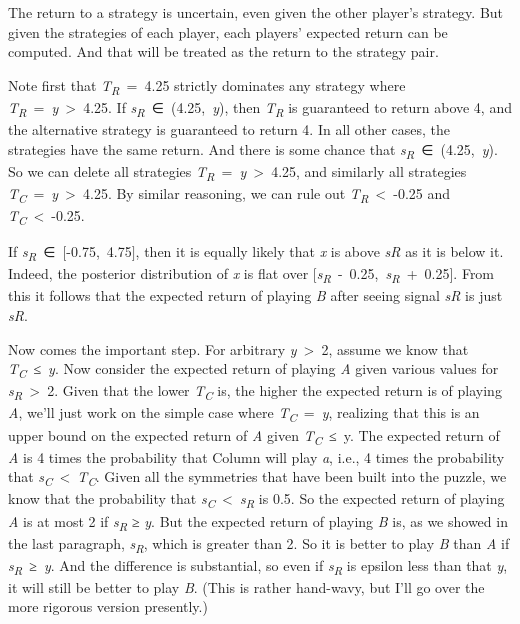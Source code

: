 \documentclass[
  11pt,
]{book}
\begin{document}
The return to a strategy is uncertain, even given the other player's strategy. But given the strategies of each player, each players' expected return can be computed. And that will be treated as the return to the strategy pair.

Note first that \emph{T\textsubscript{R}}~=~4.25 strictly dominates any strategy where \emph{T\textsubscript{R}}~=~\emph{y}~\textgreater~4.25. If \emph{s\textsubscript{R}}~∈~(4.25,~\emph{y}), then \emph{T\textsubscript{R}} is guaranteed to return above 4, and the alternative strategy is guaranteed to return 4. In all other cases, the strategies have the same return. And there is some chance that \emph{s\textsubscript{R}}~∈~(4.25,~\emph{y}). So we can delete all strategies \emph{T\textsubscript{R}}~=~\emph{y}~\textgreater~4.25, and similarly all strategies \emph{T\textsubscript{C}}~=~\emph{y}~\textgreater~4.25. By similar reasoning, we can rule out \emph{T\textsubscript{R}}~\textless~-0.25 and \emph{T\textsubscript{C}}~\textless~-0.25.

If \emph{s\textsubscript{R}}~∈~\([\)-0.75,~4.75\(]\), then it is equally likely that \emph{x} is above \emph{sR} as it is below it. Indeed, the posterior distribution of \emph{x} is flat over \([\)\emph{s\textsubscript{R}}~-~0.25,~\emph{s\textsubscript{R}}~+~0.25\(]\). From this it follows that the expected return of playing \emph{B} after seeing signal \emph{sR} is just \emph{sR}.

Now comes the important step. For arbitrary \emph{y}~\textgreater~2, assume we know that \emph{T\textsubscript{C}}~≤~\emph{y}. Now consider the expected return of playing \emph{A} given various values for \emph{s\textsubscript{R}}~\textgreater~2. Given that the lower \emph{T\textsubscript{C}} is, the higher the expected return is of playing \emph{A}, we'll just work on the simple case where \emph{T\textsubscript{C}}~=~\emph{y}, realizing that this is an upper bound on the expected return of \emph{A} given \emph{T\textsubscript{C}}~≤~y. The expected return of \emph{A} is 4 times the probability that Column will play \emph{a}, i.e., 4 times the probability that \emph{s\textsubscript{C}}~\textless~\emph{T\textsubscript{C}}. Given all the symmetries that have been built into the puzzle, we know that the probability that \emph{s\textsubscript{C}}~\textless~\emph{s\textsubscript{R}} is 0.5. So the expected return of playing \emph{A} is at most 2 if \emph{s\textsubscript{R}} ≥ \emph{y}. But the expected return of playing \emph{B} is, as we showed in the last paragraph, \emph{s\textsubscript{R}}, which is greater than 2. So it is better to play \emph{B} than \emph{A} if \emph{s\textsubscript{R}}~≥~\emph{y}. And the difference is substantial, so even if \emph{s\textsubscript{R}} is epsilon less than that \emph{y}, it will still be better to play \emph{B}. (This is rather hand-wavy, but I'll go over the more rigorous version presently.)
\end{document}
